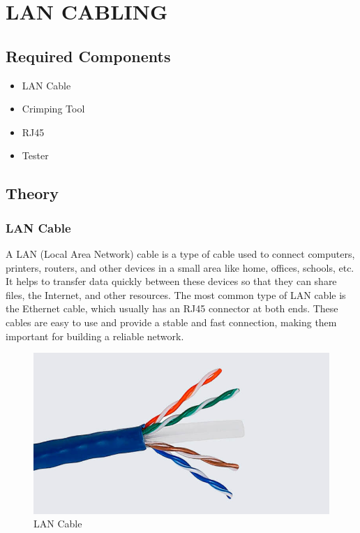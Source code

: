 \documentclass[a4paper,12pt]{report}
\newcommand{\labtopic}{LAN CABLING}
\begin{document}

\chapter*{\centering \labtopic}
\section*{Required Components}
\begin{itemize}
    \item LAN Cable
    \item Crimping Tool
    \item RJ45
    \item Tester
\end{itemize}

\section*{Theory}
\subsection*{LAN Cable}
A LAN (Local Area Network) cable is a type of cable used to connect computers, printers, routers, and other devices in a small area like home, offices, schools, etc. It helps to transfer data quickly between these devices so that they can share files, the Internet, and other resources. The most common type of LAN cable is the Ethernet cable, which usually has an RJ45 connector at both ends. These cables are easy to use and provide a stable and fast connection, making them important for building a reliable network.\\
\begin{figure}[h]
    \centering
    \includegraphics[width=0.9\linewidth]{lan-cable.jpg}
    \caption{LAN Cable}
    \label{fig:lan_cable}
\end{figure}
\end{document}
